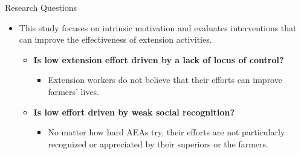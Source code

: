 \documentclass[aspectratio=169]{beamer}
\begin{document}
\begin{frame}{Research Questions} %
	\begin{itemize}
		\item This study focuses on intrinsic motivation and evaluates interventions that can improve the effectiveness of extension activities.
		
		\vspace{0.3cm}
		
		\begin{itemize}
			
			\item \textbf{Is low extension effort driven by a lack of locus of control?}
			\begin{itemize}
				\item Extension workers do not believe that their efforts can improve farmers' lives.
			\end{itemize}
			
			\vspace{0.3cm}
			
			\item \textbf{Is low effort driven by weak social recognition?}
			\begin{itemize}
				\item No matter how hard AEAs try, their efforts are not particularly recognized or appreciated by their superiors or the farmers. 
			\end{itemize}
			
			\vspace{0.3cm}
			
			
		\end{itemize}
		
	\end{itemize}
\end{frame}
\end{document}
